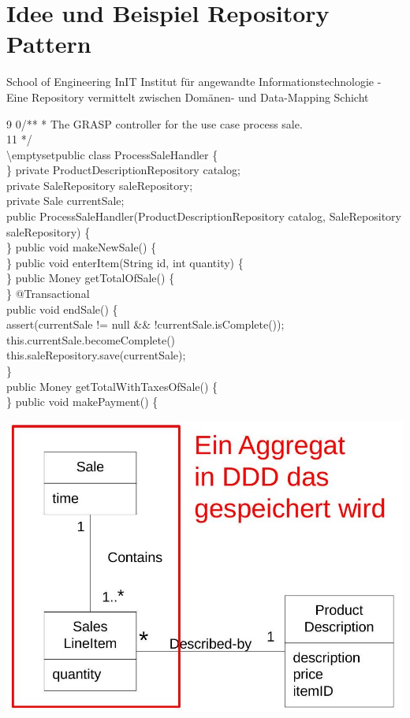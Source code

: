 \section*{Idee und Beispiel Repository Pattern}

School of Engineering
InIT Institut für angewandte Informationstechnologie
- Eine Repository vermittelt zwischen Domänen- und Data-Mapping Schicht


9 0/** * The GRASP controller for the use case process sale.\\
11 */\\
\textbackslash emptysetpublic class ProcessSaleHandler \{\\\}
private ProductDescriptionRepository catalog;\\
private SaleRepository saleRepository;\\
private Sale currentSale;\\
public ProcessSaleHandler(ProductDescriptionRepository catalog, SaleRepository saleRepository) \{\\\}
public void makeNewSale() \{\\\}
public void enterItem(String id, int quantity) \{\\\}
public Money getTotalOfSale() \{\\\}
@Transactional\\
public void endSale() \{\\
assert(currentSale != null \&\& !currentSale.isComplete());\\
this.currentSale.becomeComplete()\\
this.saleRepository.save(currentSale);\\
\}\\
public Money getTotalWithTaxesOfSale() \{\\\}
public void makePayment() \{



\includegraphics[width=\linewidth]{images/2025_01_02_5ba1dc702e9f94ba8e06g-36.jpg}


